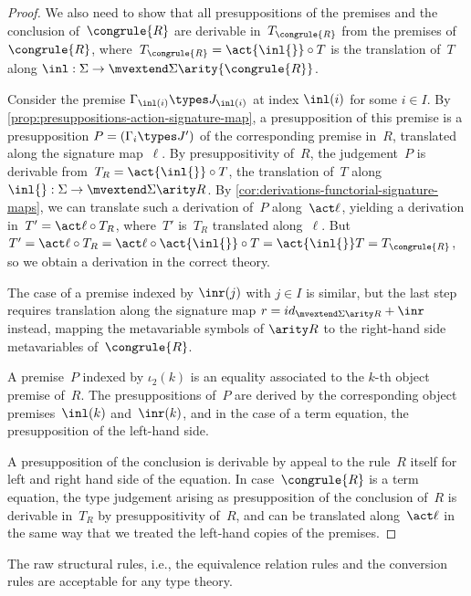 \begin{proof}
  We also need to show that all presuppositions of the premises and the conclusion of~$\congrule{R}$ are derivable in~$T_{\congrule{R}}$ from the premises of~$\congrule{R}$, where~$T_{\congrule{R}} = \act {\inl{}} \circ T$ is the translation of~$T$ along $\inl : \Sigma \to \mvextend \Sigma {\arity{\congrule{R}}}$.

  Consider the premise $\Gamma_{\inl(i)} \types J_{\inl(i)}$ at index $\inl(i)$ for some $i \in I$. By \cref{prop:presuppositions-action-signature-map}, a presupposition of this premise is a presupposition $P = (\Gamma_i \types J')$ of the corresponding premise in~$R$, translated along the signature map~$\ell$.
  By presuppositivity of~$R$, the judgement~$P$ is derivable from~$T_R = \act {\inl{}} \circ T$, the translation of~$T$ along $\inl{} : \Sigma \to \mvextend \Sigma {\arity R}$. By \cref{cor:derivations-functorial-signature-maps}, we can translate such a derivation of~$P$ along~$\act \ell$, yielding a derivation in~$T' = \act \ell \circ T_R$, where~$T'$ is~$T_R$ translated along~$\ell$. But $T' = \act \ell \circ T_R = \act \ell \circ \act {\inl{}} \circ T = \act {\inl{}} T = T_{\congrule{R}}$, so we obtain a derivation in the correct theory.

  The case of a premise indexed by $\inr(j)$ with $j \in I$ is similar, but the last step requires translation along the signature map $r = id_{\mvextend \Sigma {\arity R}} + \inr$ instead, mapping the metavariable symbols of $\arity R$ to the right-hand side metavariables of~$\congrule{R}$.

  A premise~$P$ indexed by $\iota_2(k)$ is an equality associated to the $k$-th object premise of~$R$. The presuppositions of~$P$ are derived by the corresponding object premises~$\inl(k)$ and~$\inr(k)$, and in the case of a term equation, the presupposition of the left-hand side.

  A presupposition of the conclusion is derivable by appeal to the rule~$R$ itself for left and right hand side of the equation. In case~$\congrule{R}$ is a term equation, the type judgement arising as presupposition of the conclusion of~$R$ is derivable in~$T_R$ by presuppositivity of~$R$, and can be translated along~$\act \ell$ in the same way that we treated the left-hand copies of the premises.
\end{proof}

\begin{proposition}%
  \label{prop:structural-rules-acceptable}
  The raw structural rules, i.e., the equivalence relation rules and the conversion rules are acceptable for any type theory.
\end{proposition}

